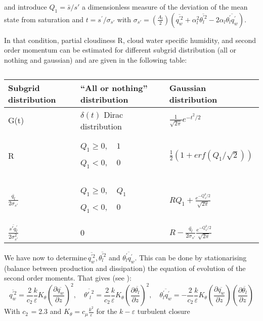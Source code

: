 and introduce $Q_{1}=\bar{s}/s'$ a dimensionless measure of the deviation of
the mean state from saturation and $t=s^{'}/\sigma_{s'}$ with $\sigma
_{s'}=(\frac{A_{l}}{2})(\overline{q_{w}^{'2}}+\alpha_{l}^{2}\overline{\theta
_{l}^{'2}}-2\alpha_{l}\overline{\theta_{l}^{'}q_{w}^{'}})$.

In that condition, partial cloudiness R, cloud water specific humidity, and
second order momentum can be estimated for different subgrid distribution
(all or nothing and gaussian) and are given in the following table:

\begin{table}[htbp]
\begin{center}
\caption[distribution]{}
\begin{tabular}{|p{99pt}|p{177pt}|p{184pt}|}
\hline
Subgrid distribution&
``All or nothing'' distribution&
Gaussian distribution \\
\hline
G(t)&
$\delta (t)$ Dirac distribution&
$\frac{1}{\sqrt {2\pi } }e^{-t^{2}/2}$ \\
\hline
R&
$Q_{1}\ge 0,\quad 1$ \par $Q_{1}<0,\quad 0$&
$\frac{1}{2}\left(1+erf\left(Q_{1}/\sqrt 2 \right) \right)$ \\
\hline
$\frac{\overline{q_{l}}}{2\sigma_{s'}}$&
$Q_{1}\ge 0,\quad Q_{1}$ \par $Q_{1}<0,\quad 0$&
$RQ_{1}+\frac{e^{-Q_{1}^{2}/2}}{\sqrt {2\pi } }$ \\
\hline
$
\frac{\overline{s'q_{l}^{'}}}{2\sigma_{s'}^{2}}
$
&
0&
$R-\frac{\bar{q_{l}}}{2\sigma_{s'}}\frac{e^{-Q_{1}^{2}/2}}{\sqrt {2\pi } }$\\
\hline
\end{tabular}
\label{tab3}
\end{center}
\end{table}

We have now to determine$\, \overline{q_{w}^{'2}}$,$\, \overline{\theta_{l}^{'2}}$
and $\overline{\theta_{l}^{'}q_{w}^{'}}$. This can be done by stationarising
(balance between production and dissipation) the equation of evolution of
the second order moments. That gives (see \cite{Musson-Genon:1995}):
\begin{equation}
\overline{q_{w}^{'2}}=\frac{2}{c_{2}}\frac{k}{\varepsilon }K_{\theta }\left(
\frac{\partial \overline {q_{w}}}{\partial z} \right)^{2}{,\quad
\overline{{\theta'_{l}}^{2}}}=\frac{2}{c_{2}}\frac{k}{\varepsilon }K_{\theta }\left(
\frac{\partial \overline{\theta_{l}}}{\partial z} \right)^{2},\quad
\overline{\theta_{l}^{'}q_{w}^{'}}=-\frac{2}{c_{2}}\frac{k}{\varepsilon }K_{\theta }{\left(
\frac{\partial \overline {q_{w}}}{\partial z} \right)\left( \frac{\partial
\overline{\theta_{l}}}{\partial z} \right)}
\end{equation}
With $c_{2\, }=$2.3 and $K_{\theta }=c_{\mu }\frac{k^{2}}{\varepsilon }$
for the $k-\varepsilon $ turbulent closure


